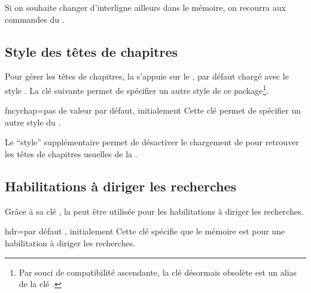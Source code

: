 Si on souhaite changer d'interligne ailleurs dans le mémoire, on recourra aux
commandes du  .

\subsection{Style des têtes de chapitres}\label{sec-style-des-tetes}

Pour gérer les têtes de chapitres, la \yatCl{} s'appuie sur le
, par défaut chargé avec le style . La
clé  suivante permet de spécifier un autre style de ce
package\footnote{Par souci de compatibilité ascendante, la clé désormais
  obsolète  est un alias de la clé
  .}.%
%
{%
  \begin{docKey}{fncychap}{=\textbar{}\textbar{}\textbar{}\textbar{}\textbar{}\textbar{}\textbar{}\textbar{}}{pas
      de valeur par défaut, initialement }
    Cette clé permet de spécifier un autre style du .

    Le \enquote{style} supplémentaire  permet de désactiver le
    chargement de  pour retrouver les têtes de chapitres
    usuelles de la .
  \end{docKey}
}

\subsection{Habilitations à diriger les recherches}
\label{sec-hdr}%

Grâce à sa clé , la \yatCl{} peut être utilisée pour les
habilitations à diriger les recherches.

\begin{docKey}{hdr}{=\textbar{}}{par défaut
    , initialement }
  Cette clé spécifie que le mémoire est pour une habilitation à diriger les
  recherches.
\end{docKey}

